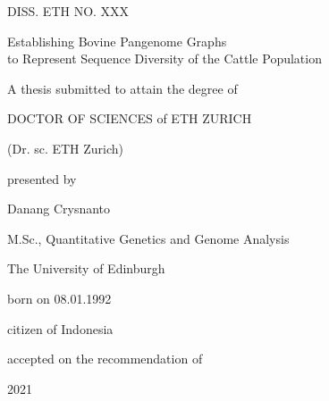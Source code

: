 \documentclass[../main.tex]{subfiles}
\begin{document}
\setlength{\parskip}{0pt}
\begin{center}
    \thispagestyle{empty}

    DISS. ETH NO. XXX 

    \vspace{2cm}

    {\large Establishing Bovine Pangenome Graphs \\ to Represent Sequence Diversity of the Cattle Population}

    \vspace{2cm}
    
    \doublespacing
    A thesis submitted to attain the degree of

    DOCTOR OF SCIENCES of ETH ZURICH

    (Dr. sc. ETH Zurich)
    \vspace{1cm}

    presented by

    \vspace{1cm}
    Danang Crysnanto  

    \vspace{1cm}

    M.Sc., Quantitative Genetics and Genome Analysis 
    
    The University of Edinburgh

    \vspace{1cm}

    born on 08.01.1992

    citizen of Indonesia

    \vspace{2cm}

    accepted on the recommendation of     
    \vspace{2cm}

    \vspace{0.5cm}
    2021
\end{center}
\end{document}
